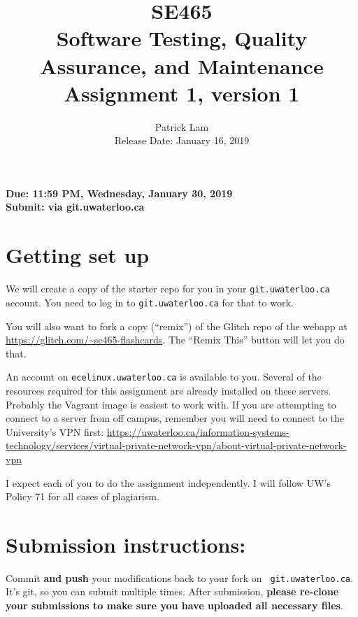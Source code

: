 \documentclass[10pt,hidelinks]{article}
\begin{document}
\title{
SE465 \\
Software Testing, Quality Assurance, and Maintenance\\
Assignment 1, version 1}
\author{Patrick Lam \\
{Release Date:  January 16, 2019} \\
}
\renewcommand{\today}{}
\maketitle

\begin{center}

{\bf Due:  11:59 PM, Wednesday, January 30, 2019} \\
{\bf Submit: via git.uwaterloo.ca }\\
\end{center}

\section*{Getting set up}
We will create a copy of the starter repo for you in your {\tt git.uwaterloo.ca} account. You need to log in to {\tt git.uwaterloo.ca} for that to work.

You will also want to fork a copy (``remix'') of the Glitch repo of the webapp at
\url{https://glitch.com/~se465-flashcards}. The ``Remix This'' button will let you do that.

An account on {\tt ecelinux.uwaterloo.ca} is available to you.
Several of the resources required for this assignment are already installed on these servers. Probably the Vagrant image is easiest to work with.
If you are attempting to connect to a server from off campus, remember you will need to connect to the University's VPN first: \url{https://uwaterloo.ca/information-systems-technology/services/virtual-private-network-vpn/about-virtual-private-network-vpn}

I expect each of you to do the assignment independently. I will follow UW's Policy 71 for all cases of plagiarism.
 
\newpage
 \section*{Submission instructions:} 
Commit {\bf and push} your modifications back to your fork on {\tt
  git.uwaterloo.ca}.  It's git, so you can submit multiple times. After
submission, {\bf please re-clone your submissions to make sure you
  have uploaded all necessary files}.
 
\end{document}

